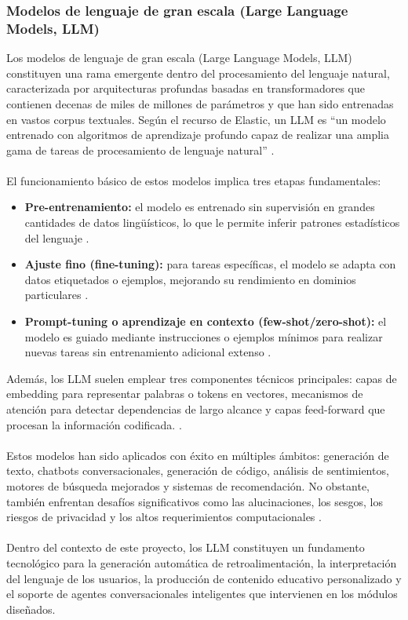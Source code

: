 \subsubsection{Modelos de lenguaje de gran escala (Large Language Models, LLM)}

Los modelos de lenguaje de gran escala (Large Language Models, LLM) constituyen una rama emergente dentro del procesamiento del lenguaje natural, caracterizada por arquitecturas profundas basadas en transformadores que contienen decenas de miles de millones de parámetros y que han sido entrenadas en vastos corpus textuales. Según el recurso de Elastic, un LLM es “un modelo entrenado con algoritmos de aprendizaje profundo capaz de realizar una amplia gama de tareas de procesamiento de lenguaje natural” \cite{ElasticLLM}.
\\
\\
El funcionamiento básico de estos modelos implica tres etapas fundamentales:
\begin{itemize}
  \item \textbf{Pre-entrenamiento:} el modelo es entrenado sin supervisión en grandes cantidades de datos lingüísticos, lo que le permite inferir patrones estadísticos del lenguaje \cite{ElasticLLM}.
  \item \textbf{Ajuste fino (fine-tuning):} para tareas específicas, el modelo se adapta con datos etiquetados o ejemplos, mejorando su rendimiento en dominios particulares \cite{ElasticLLM}.
  \item \textbf{Prompt-tuning o aprendizaje en contexto (few-shot/zero-shot):} el modelo es guiado mediante instrucciones o ejemplos mínimos para realizar nuevas tareas sin entrenamiento adicional extenso \cite{ElasticLLM}.
\end{itemize}

Además, los LLM suelen emplear tres componentes técnicos principales: capas de embedding para representar palabras o tokens en vectores, mecanismos de atención para detectar dependencias de largo alcance y capas feed-forward que procesan la información codificada. \cite{ElasticLLM}.
\\
\\
Estos modelos han sido aplicados con éxito en múltiples ámbitos: generación de texto, chatbots conversacionales, generación de código, análisis de sentimientos, motores de búsqueda mejorados y sistemas de recomendación. No obstante, también enfrentan desafíos significativos como las alucinaciones, los sesgos, los riesgos de privacidad y los altos requerimientos computacionales \cite{ElasticLLM}.
\\
\\
Dentro del contexto de este proyecto, los LLM constituyen un fundamento tecnológico para la generación automática de retroalimentación, la interpretación del lenguaje de los usuarios, la producción de contenido educativo personalizado y el soporte de agentes conversacionales inteligentes que intervienen en los módulos diseñados.


